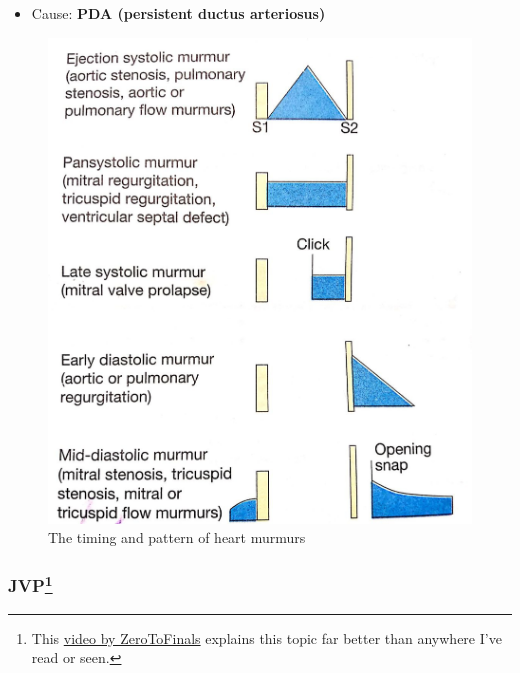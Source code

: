 \documentclass[
  12pt,
]{memoir}
\providecommand{\tightlist}{%
  \setlength{\itemsep}{0pt}\setlength{\parskip}{0pt}}
\begin{document}
\begin{itemize}
\tightlist
\item
  Cause: \textbf{PDA (persistent ductus arteriosus)}
\end{itemize}

\begin{figure}[!h]
    \centering
    \includegraphics[width=.5\textwidth]{../assets/med/murmur.jpg}
    \vspace{7mm}
    \caption{The timing and pattern of heart murmurs}
    \label{fig:murmur}
\end{figure}

\subsubsection[JVP]{JVP\footnote{This \href{https://youtu.be/Z4yRBhlK0uY}
{video by ZeroToFinals} explains this topic far better than anywhere I've
 read or seen.}}
\end{document}

